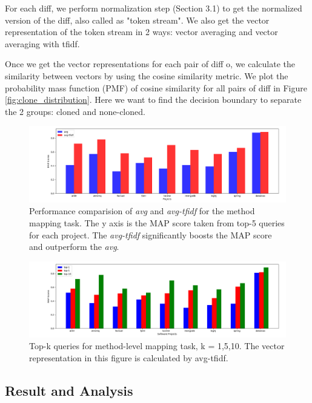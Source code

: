 For each diff, we perform normalization step (Section 3.1) to get the normalized version of the diff, also called as "token stream". We also get the vector representation of the token stream in 2 ways: vector averaging and vector averaging with tfidf.

Once we get the vector representations for each pair of diff o, we calculate the similarity between vectors by using the cosine similarity metric. We plot the probability mass function (PMF) of cosine similarity for all pairs of diff in Figure \ref{fig:clone_distribution}. Here we want to find the decision boundary to separate the 2 groups: cloned and none-cloned. 


\begin{figure}[t!]
	\centering
	
	\includegraphics[width=1.05\textwidth]{avg_vs_tfidf}
	\caption{Performance comparision of \textit{avg} and \textit{avg-tfidf} for the method mapping task. The y axis is the MAP score taken from top-5 queries for each project. The \textit{avg-tfidf} significantly boosts the MAP score and outperform the \textit{avg}.}
	\label{fig:avg_vs_tfidf}
\end{figure}

\begin{figure}[t!]
	\centering
	\includegraphics[width=1.05\textwidth]{top_k}
	\caption{Top-k queries for method-level mapping task, k = 1,5,10. The vector representation in this figure is calculated by avg-tfidf.}
	\label{fig:top_k}
\end{figure}

\subsection{Result and Analysis}
